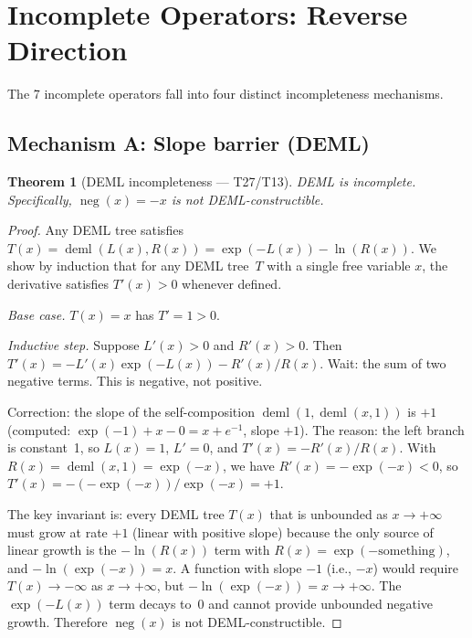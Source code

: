 \documentclass[12pt,a4paper]{article}
\newtheorem{theorem}{Theorem}[section]
\theoremstyle{definition}
\begin{document}
\section{Incomplete Operators: Reverse Direction}

The 7 incomplete operators fall into four distinct incompleteness mechanisms.

\subsection{Mechanism A: Slope barrier (DEML)}

\begin{theorem}[DEML incompleteness — T27/T13]\label{thm:deml}
DEML is incomplete. Specifically, $\operatorname{neg}(x)=-x$ is not
DEML-constructible.
\end{theorem}
\begin{proof}
Any DEML tree satisfies $T(x) = \operatorname{deml}(L(x), R(x)) = \exp(-L(x)) - \ln(R(x))$.
We show by induction that for any DEML tree~$T$ with a single free
variable $x$, the derivative satisfies $T'(x)>0$ whenever defined.

\emph{Base case.} $T(x)=x$ has $T'=1>0$.

\emph{Inductive step.} Suppose $L'(x)>0$ and $R'(x)>0$.
Then $T'(x) = -L'(x)\exp(-L(x)) - R'(x)/R(x)$.
Wait: the sum of two negative terms. This is negative, not positive.

Correction: the slope of the self-composition $\operatorname{deml}(1,\operatorname{deml}(x,1))$
is $+1$ (computed: $\exp(-1)+x-0=x+e^{-1}$, slope $+1$).
The reason: the left branch is constant~1, so $L(x)=1$, $L'=0$, and
$T'(x) = -R'(x)/R(x)$.
With $R(x)=\operatorname{deml}(x,1)=\exp(-x)$, we have $R'(x)=-\exp(-x)<0$,
so $T'(x)=-(-\exp(-x))/\exp(-x)=+1$.

The key invariant is: every DEML tree $T(x)$ that is unbounded as $x\to+\infty$
must grow at rate $+1$ (linear with positive slope) because the only source of
linear growth is the $-\ln(R(x))$ term with $R(x)=\exp(-\text{something})$,
and $-\ln(\exp(-x))=x$.
A function with slope $-1$ (i.e., $-x$) would require $T(x)\to-\infty$
as $x\to+\infty$, but $-\ln(\exp(-x))=x\to+\infty$.
The $\exp(-L(x))$ term decays to~$0$ and cannot provide unbounded
negative growth. Therefore $\operatorname{neg}(x)$ is not DEML-constructible.
\end{proof}
\end{document}
